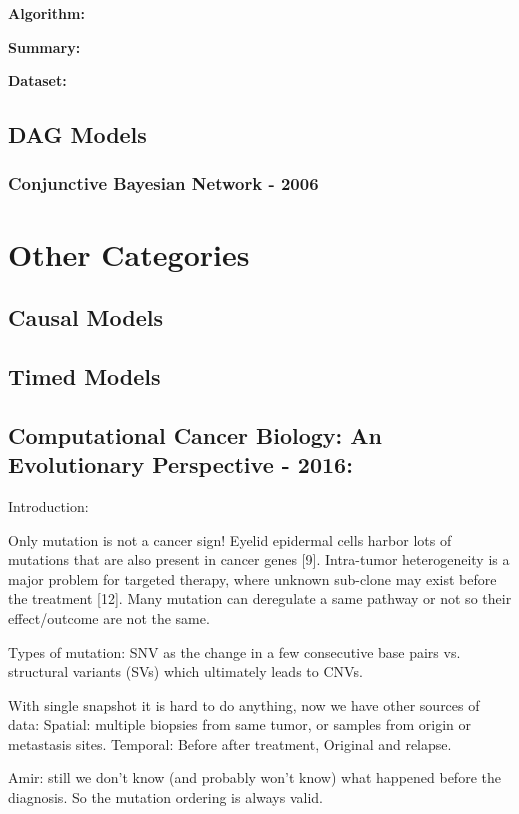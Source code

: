	{\bf Algorithm:}
	
	{\bf Summary:}
	
	{\bf Dataset:}
	
	
	\subsection{DAG Models}

	\subsubsection{Conjunctive Bayesian Network - 2006}

	\section{Other Categories}
	\subsection{Causal Models}
	
	\subsection{Timed Models}	
	
	
	\subsection{Computational Cancer Biology: An Evolutionary Perspective - 2016:}
	
	Introduction:
	
	Only mutation is not a cancer sign! Eyelid epidermal cells harbor lots of mutations that are also present in cancer genes [9].
	Intra-tumor heterogeneity is a major problem for targeted therapy, where unknown sub-clone may exist before the treatment [12].
	Many mutation can deregulate a same pathway or not so their effect/outcome are not the same.
	
	Types of mutation: SNV as the change in a few consecutive base pairs vs. structural variants (SVs) which ultimately leads to CNVs. 
	
	With single snapshot it is hard to do anything, now we have other sources of data:
	Spatial: multiple biopsies from same tumor, or samples from origin or metastasis sites. 
	Temporal: Before after treatment, Original and relapse. 
	
	Amir: still we don't know (and probably won't know) what happened before the diagnosis. So the mutation ordering is always valid. 
	
